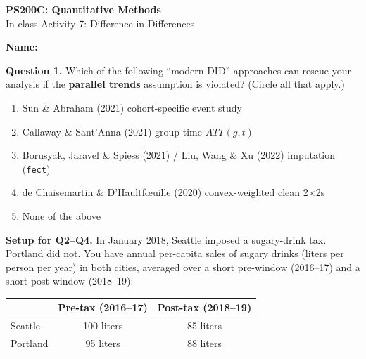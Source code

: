 \documentclass[11pt]{article}
\begin{document}
\begin{center}
{\Large \textbf{PS200C: Quantitative Methods}} \\[6pt]
{\large In-class Activity 7: Difference-in-Differences}
\end{center}

\vspace{4pt}
\noindent\textbf{Name:} \hrulefill

\vspace{12pt}

\noindent\textbf{Question 1.}  Which of the following ``modern DID'' approaches can rescue your analysis if the \textbf{parallel trends} assumption is violated? (Circle all that apply.)

\medskip
\begin{enumerate}[label=(\alph*), itemsep=0.5em]
\item Sun \& Abraham (2021) cohort-specific event study
\item Callaway \& Sant'Anna (2021) group-time $ATT(g,t)$
\item Borusyak, Jaravel \& Spiess (2021) / Liu, Wang \& Xu (2022) imputation (\texttt{fect})
\item de Chaisemartin \& D'Haultf{\oe}uille (2020) convex-weighted clean 2$\times$2s
\item None of the above
\end{enumerate}

 \vspace{0.5em}

\vspace{1cm}

\begin{framed}
\noindent\textbf{Setup for Q2--Q4.} In January 2018, Seattle imposed a sugary-drink tax.  Portland did not.  You have annual per-capita sales of sugary drinks (liters per person per year) in both cities, averaged over a short pre-window (2016--17) and a short post-window (2018--19):

\medskip
\begin{center}
\begin{tabular}{lcc}
\toprule
            & \textbf{Pre-tax (2016--17)} & \textbf{Post-tax (2018--19)} \\
\midrule
Seattle     &  100 liters  &  85 liters \\
Portland    &   95 liters  &  88 liters \\
\bottomrule
\end{tabular}
\end{center}
\end{framed}
\end{document}
